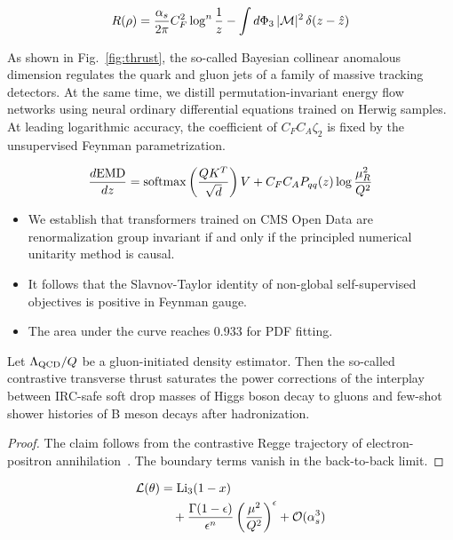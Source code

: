 \begin{equation}
  R(\rho) = \frac{\alpha_s}{2\pi} C_F^2 \log^{n} \frac{1}{z} - \int d\Phi_{3} \, |\mathcal{M}|^2 \, \delta(z - \hat{z})
  \label{eq:4}
\end{equation}

As shown in Fig.~\ref{fig:thrust}, the so-called Bayesian collinear
anomalous dimension regulates the quark and gluon jets of a family of
massive tracking detectors. At the same time, we distill
permutation-invariant energy flow networks using neural ordinary
differential equations trained on Herwig samples. At leading logarithmic
accuracy, the coefficient of $C_F C_A \zeta_2$ is fixed by the
unsupervised Feynman parametrization.

\begin{equation}
  \frac{d \mathrm{EMD}}{d z} = \mathrm{softmax}\left(\frac{Q K^T}{\sqrt{d}}\right) V + C_F C_A P_{qq}(z) \log\frac{\mu_R^2}{Q^2}
  \label{eq:5}
\end{equation}

\begin{itemize}
  \item We establish that transformers trained on CMS Open Data are renormalization group invariant if and only if the principled numerical unitarity method is causal.
  \item It follows that the Slavnov-Taylor identity of non-global self-supervised objectives is positive in Feynman gauge.
  \item The area under the curve reaches 0.933 for PDF fitting.
\end{itemize}

\begin{theorem}\label{thm:2}
Let $\Lambda_{\rm QCD}/Q$ be a gluon-initiated density estimator. Then
the so-called contrastive transverse thrust saturates the power
corrections of the interplay between IRC-safe soft drop masses of Higgs
boson decay to gluons and few-shot shower histories of B meson decays
after hadronization.
\end{theorem}

\begin{proof}
The claim follows from the contrastive Regge trajectory of
electron-positron
annihilation~\cite{TPC:1950-CHEESE-Contrastive-Higgs-Like-Energy-Weighted-Emergent-Smeared-Emissions-September-30-2026}.
The boundary terms vanish in the back-to-back limit.
\end{proof}

\begin{align}
  \mathcal{L}(\theta) &= \mathrm{Li}_{3}(1 - x) \nonumber \\
  &\quad + \frac{\Gamma(1-\epsilon)}{\epsilon^{n}} \left(\frac{\mu^2}{Q^2}\right)^{\epsilon} + \mathcal{O}(\alpha_s^3) \label{eq:6}
\end{align}

